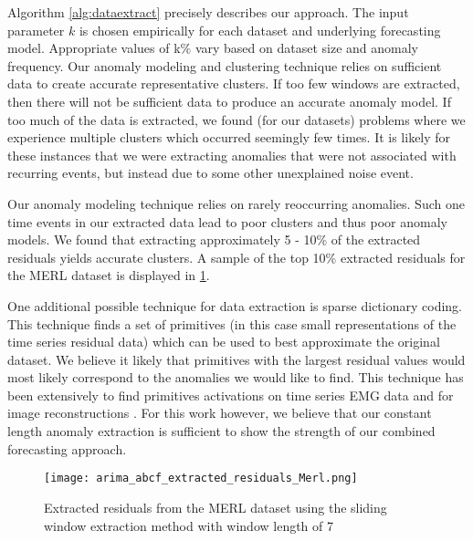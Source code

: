 Algorithm \ref{alg:dataextract} precisely describes our approach.  The input parameter $k$ is chosen empirically for each dataset and underlying forecasting model.  Appropriate values of k\% vary based on dataset size and anomaly frequency.  Our anomaly modeling and clustering technique relies on sufficient data to create accurate representative clusters.  If too few windows are extracted, then there will not be sufficient data to produce an accurate anomaly model.  If too much of the data is extracted, we found (for our datasets) problems where we experience multiple clusters which occurred seemingly few times.  It is likely for these instances that we were extracting anomalies that were not associated with recurring events, but instead due to some other unexplained noise event.  

Our anomaly modeling technique relies on rarely reoccurring anomalies.  Such one time events in our extracted data lead to poor clusters and thus poor anomaly models.  We found that extracting approximately 5 - 10\% of the extracted residuals yields accurate clusters.  A sample of the top 10\% extracted residuals for the MERL dataset is displayed in \ref{fig:extracted_residuals}.  

One additional possible technique for data extraction is sparse dictionary coding.  This technique finds a set of primitives (in this case small representations of the time series residual data) which can be used to best approximate the original dataset.  We believe it likely that primitives with the largest residual values would most likely correspond to the anomalies we would like to find.  This technique has been extensively to find primitives activations on time series EMG data \cite{Kim2010} and for image reconstructions \cite{Mairal2009}.  For this work however, we believe that our constant length anomaly extraction is sufficient to show the strength of our combined forecasting approach.

\begin{figure}
	\begin{center}
		\texttt{[image: arima\_abcf\_extracted\_residuals\_Merl.png]}
	\end{center}
	\caption{Extracted residuals from the MERL dataset using the sliding window extraction method with window length of 7}
	\label{fig:extracted_residuals}
\end{figure}


